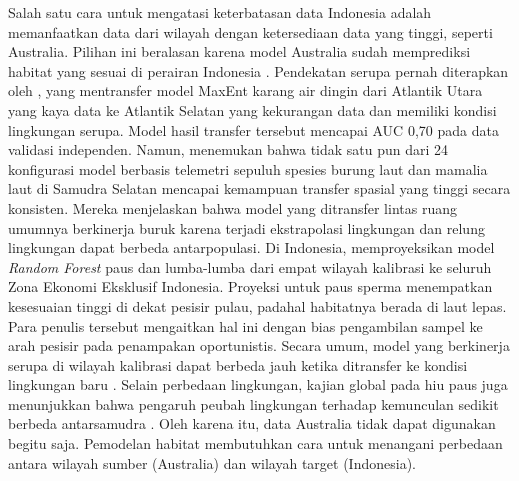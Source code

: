 Salah satu cara untuk mengatasi keterbatasan data Indonesia adalah memanfaatkan
data dari wilayah dengan ketersediaan data yang tinggi, seperti Australia.
Pilihan ini beralasan karena model Australia sudah memprediksi habitat yang
sesuai di perairan Indonesia \citep{Reynolds2017}. Pendekatan serupa pernah
diterapkan oleh \citet{Bridges2023}, yang mentransfer model MaxEnt karang air
dingin dari Atlantik Utara yang kaya data ke Atlantik Selatan yang kekurangan data
dan memiliki kondisi lingkungan serupa. Model hasil transfer tersebut mencapai
AUC 0,70 pada data validasi independen. Namun, \citet{Wilson2026} menemukan
bahwa tidak satu pun dari 24 konfigurasi model berbasis telemetri sepuluh
spesies burung laut dan mamalia laut di Samudra Selatan mencapai kemampuan
transfer spasial yang tinggi secara konsisten. Mereka menjelaskan bahwa model
yang ditransfer lintas ruang umumnya berkinerja buruk karena terjadi
ekstrapolasi lingkungan dan relung lingkungan dapat berbeda antarpopulasi. Di
Indonesia, \citet{Sahri2023} memproyeksikan model \textit{Random Forest} paus
dan lumba-lumba dari empat wilayah kalibrasi ke seluruh Zona Ekonomi Eksklusif
Indonesia. Proyeksi untuk paus sperma menempatkan kesesuaian tinggi di dekat
pesisir pulau, padahal habitatnya berada di laut lepas. Para penulis tersebut
mengaitkan hal ini dengan bias pengambilan sampel ke arah pesisir pada
penampakan oportunistis. Secara umum, model yang berkinerja serupa di wilayah
kalibrasi dapat berbeda jauh ketika ditransfer ke kondisi lingkungan baru
\citep{Elith2010}. Selain perbedaan lingkungan, kajian global pada hiu paus
juga menunjukkan bahwa pengaruh peubah lingkungan terhadap kemunculan sedikit
berbeda antarsamudra \citep{Sequeira2014}. Oleh karena itu, data Australia
tidak dapat digunakan begitu saja. Pemodelan habitat membutuhkan cara untuk
menangani perbedaan antara wilayah sumber (Australia) dan wilayah target
(Indonesia).

